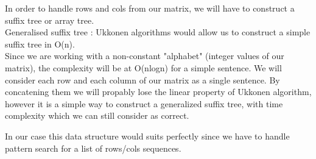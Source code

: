 \par
In order to handle rows and cols from our matrix, we will have to construct a suffix tree or array tree.\\
Generalised suffix tree : Ukkonen algorithms would allow us to construct a simple suffix tree in O(n).\\
Since we are working with a non-constant "alphabet" (integer values of our matrix), the complexity will be at O(nlogn)
for a simple sentence. We will consider each row and each column of our matrix as a single sentence. By concatening them we will propably lose the linear property of Ukkonen algorithm, however it is a simple way to construct a generalized suffix tree, with time complexity which we can still consider as correct.\\

\par
In our case this data structure would suits perfectly since we have to handle pattern search for a list of rows/cols sequences.

